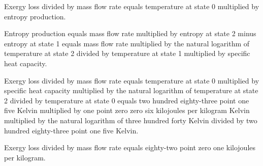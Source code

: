 Exergy loss divided by mass flow rate equals temperature at state 0 multiplied by entropy production.  

Entropy production equals mass flow rate multiplied by entropy at state 2 minus entropy at state 1 equals mass flow rate multiplied by the natural logarithm of temperature at state 2 divided by temperature at state 1 multiplied by specific heat capacity.  

Exergy loss divided by mass flow rate equals temperature at state 0 multiplied by specific heat capacity multiplied by the natural logarithm of temperature at state 2 divided by temperature at state 0 equals two hundred eighty-three point one five Kelvin multiplied by one point zero zero six kilojoules per kilogram Kelvin multiplied by the natural logarithm of three hundred forty Kelvin divided by two hundred eighty-three point one five Kelvin.  

Exergy loss divided by mass flow rate equals eighty-two point zero one kilojoules per kilogram.